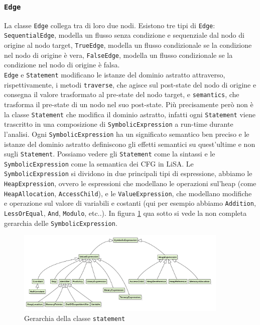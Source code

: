 \subsubsection{\texttt{Edge}}
La classe \texttt{Edge} collega tra di loro due nodi. Esistono tre tipi di \texttt{Edge}: \texttt{SequentialEdge}, modella un flusso senza condizione e sequenziale dal nodo di origine al nodo target, \texttt{TrueEdge}, modella un flusso condizionale se la condizione nel nodo di origine è vera, \texttt{FalseEdge}, modella un flusso condizionale se la condizione nel nodo di origine è falsa.
\\

\texttt{Edge} e \texttt{Statement} modificano le istanze del dominio astratto attraverso, rispettivamente, i metodi \texttt{traverse}, che agisce sul post-state del nodo di origine e consegna il valore trasformato al pre-state del nodo target, e \texttt{semantics}, che trasforma il pre-state di un nodo nel suo post-state. Più precisamente però non è la classe \texttt{Statement} che modifica il dominio astratto, infatti ogni \texttt{Statement} viene trascritto in una composizione di \texttt{SymbolicExpression} a run-time durante l'analisi. Ogni \texttt{SymbolicExpression} ha un significato semantico ben preciso e le istanze del dominio astratto definiscono gli effetti semantici su quest'ultime e non sugli \texttt{Statement}. Possiamo vedere gli \texttt{Statement} come la sintassi e le \texttt{SymbolicExpression} come la semantica dei CFG in LiSA. Le \texttt{SymbolicExpression} si dividono in due principali tipi di espressione, abbiamo le \texttt{HeapExpression}, ovvero le espressioni che modellano le operazioni sul'heap (come \texttt{HeapAllocation}, \texttt{AccessChild}), e le \texttt{ValueExpression}, che modellano modifiche e operazione sul valore di variabili e costanti (qui per esempio abbiamo \texttt{Addition}, \texttt{LessOrEqual}, \texttt{And}, \texttt{Modulo}, etc..). In figura \ref{fig:gerarchiaSymbolic} qua sotto si vede la non completa gerarchia delle \texttt{SymbolicExpression}.

\begin{figure}[ht]
	\centering
	\includegraphics[width=0.9\textwidth]{Immagini/gerarchiaSymbolicExpression.png}
	\caption{Gerarchia della classe \texttt{statement}}
	\label{fig:gerarchiaSymbolic}
\end{figure}


